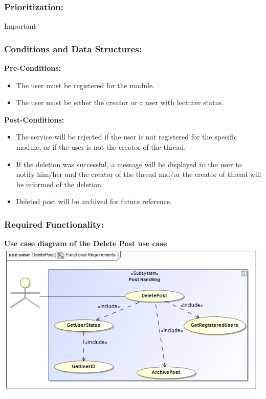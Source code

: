\documentclass[a4paper,11pt]{article}
\begin{document}
\subsubsection{Prioritization:}Important
\subsubsection{Conditions and Data Structures:}
\textbf{Pre-Conditions:}
\begin{itemize}
	\item The user must be registered for the module.
	\item The user must be either the creator or a user with lecturer status.
\end{itemize}
\textbf{Post-Conditions:}
\begin{itemize}
	\item The service will be rejected if the user is not registered for the specific module, or if the user is not the creator of the thread.
	\item If the deletion was successful, a message will be displayed to the user to notify him/her and the creator of the thread and/or the creator of thread will be informed of the deletion.
	\item Deleted post will be archived for future reference.
\end{itemize}
\subsubsection{Required Functionality:} 
\textbf{Use case diagram of the Delete Post use case}\\
\includegraphics[width=1\linewidth]{./Images/PostHandling/postDeletion.jpg}\\
\end{document}
